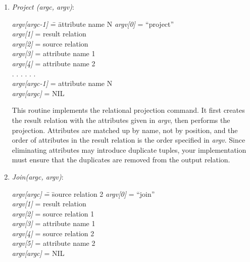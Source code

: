 \begin{enumerate}
\item \emph{Project (argc, argv)}:
\begin{tabbing}
\hspace*{0.2in}\emph{argv[argc-1]} \= = \= attribute name N  \kill
\hspace*{0.2in}\emph{argv[0]}      \> = \> ``project''         \\
\hspace*{0.2in}\emph{argv[1]}      \> = \> result relation   \\
\hspace*{0.2in}\emph{argv[2]}      \> = \> source relation   \\
\hspace*{0.2in}\emph{argv[3]}      \> = \> attribute name 1  \\
\hspace*{0.2in}\emph{argv[4]}      \> = \> attribute name 2  \\
\hspace*{0.2in}    . . .            \>     \> . . .             \\
\hspace*{0.2in}\emph{argv[argc-1]} \> = \> attribute name N  \\
\hspace*{0.2in}\emph{argv[argc]}   \> = \> NIL
\end{tabbing}

This routine implements the relational projection command.  It first
creates the result relation with the attributes given in \emph{argv},
then performs the projection.  Attributes are matched up by name, not
by position, and the order of attributes in the result relation is the
order specified in \emph{argv}.  Since eliminating attributes may
introduce duplicate tuples, your implementation must ensure that the
duplicates are removed from the output relation. 


\item \emph{Join(argc, argv)}:
\begin{tabbing}
\hspace*{0.2in}\emph{argv[argc]} \= = \= source relation 2   \kill
\hspace*{0.2in}\emph{argv[0]}    \> = \> ``join''		 \\
\hspace*{0.2in}\emph{argv[1]}    \> = \> result relation     \\
\hspace*{0.2in}\emph{argv[2]}    \> = \> source relation 1   \\
\hspace*{0.2in}\emph{argv[3]}    \> = \> attribute name 1    \\
\hspace*{0.2in}\emph{argv[4]}    \> = \> source relation 2   \\
\hspace*{0.2in}\emph{argv[5]}    \> = \> attribute name 2    \\
\hspace*{0.2in}\emph{argv[argc]} \> = \>NIL
\end{tabbing}


\end{enumerate}
